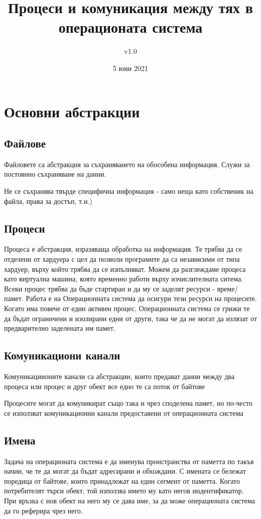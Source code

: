 \documentclass[fleqn,12pt]{article}
\title{Процеси и комуникация между тях в операционата система}
\author{v1.0}
\date{5 юни 2021}
\begin{document}
\maketitle

\tableofcontents

\section{Основни абстракции}

\subsection{Файлове}
    Файловете са абстракция за съхраняването на обособена информация. Служи за постоянно съхраняване на данни. 
    
    Не се съхранява твърде специфична информация - само неща като собственик на файла, права за достъп, т.н.)


\subsection{Процеси}
    Процеса е абстракция, изразяваща обработка на информация. Те трябва да се отделени от хардуера с цел да позволи програмите да са независими от типа хардуер, върху който трябва да се изпълняват. Можем да разглеждаме процеса като виртуална машина, която временно работи върху изчислителната ситема. Всеки процес трябва да бъде стартиран и да му се заделят ресурси - време/памет. Работа е на Операционната система да осигури тези ресурси на процесите. Когато има повече от един активен процес, Операционната система се грижи те да бъдат ограничени и изолирани едни от други, така че да не могат да излязат от предварително заделената им памет. 


\subsection{Комуникациони канали}
    Комуникациионите канали са абстракции, които предават данни между два процеса или процес и друг обект все едно те са поток от байтове
    
    Процесите могат да комуникират също така и чрез споделена памет, но по-често се използват комуникационни канали предоставени от операционната система


\subsection{Имена}
    Задача на операционата система е да именува пронстранства от паметта по такъв начин, че те да могат да бъдат адресирани и обхождани. С имената се бележат поредица от байтове, които принадлежат на един сегмент от паметта. Когато потребителят търси обект, той използва името му като негов индентификатор. При връзка с нов обект на него му се дава име, за да може операционата система да го реферира чрез него.
\end{document}
